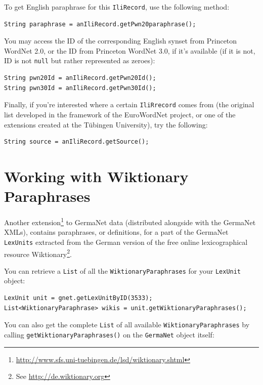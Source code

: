 \documentclass[12pt,a4paper,english,utf8]{report}
\begin{document}
To get English paraphrase for this \texttt{IliRecord}, use the following method:

\begin{lstlisting}
String paraphrase = anIliRecord.getPwn20paraphrase();
\end{lstlisting}


You may access the ID of the corresponding English synset from Princeton WordNet 2.0, or the ID from Princeton WordNet 3.0, if it's available (if it is not, ID is not \texttt{null} but rather represented as zeroes):

\begin{lstlisting}
String pwn20Id = anIliRecord.getPwn20Id();
String pwn30Id = anIliRecord.getPwn30Id();
\end{lstlisting}

Finally, if you're interested where a certain \texttt{IliRrecord} comes from (the original list developed in the framework of the EuroWordNet project, or one of the extensions created at the Tübingen University), try the following:

\begin{lstlisting}
String source = anIliRecord.getSource();
\end{lstlisting}



\section{Working with Wiktionary Paraphrases}
\label{snippetsEnd}
Another extension\footnote{\url{http://www.sfs.uni-tuebingen.de/lsd/wiktionary.shtml}} to GermaNet data (distributed alongside with the GermaNet XMLs), contains paraphrases, or definitions, for a part of the GermaNet \texttt{LexUnits} extracted from the German version of the free online lexicographical resource Wiktionary\footnote{See \href{http://de.wiktionary.org}{http://de.wiktionary.org}}.

You can retrieve a \texttt{List} of all the \texttt{WiktionaryParaphrases} for your \texttt{LexUnit} object:

\begin{lstlisting}
LexUnit unit = gnet.getLexUnitByID(3533);
List<WiktionaryParaphrase> wikis = unit.getWiktionaryParaphrases();
\end{lstlisting}

You can also get the complete \texttt{List} of all available \texttt{WiktionaryParaphrases} by calling \texttt{getWiktionaryParaphrases()} on the \texttt{GermaNet} object itself:
\end{document}
